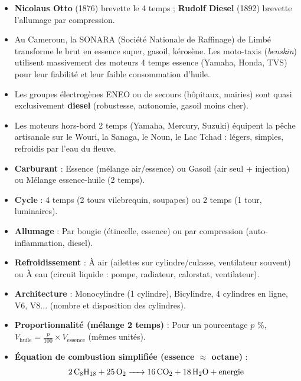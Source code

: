 \documentclass[11pt]{article}
\newcommand{\cle}[1]{{\popxbold\color{popdark}#1}}
\begin{document}
\begin{savaistu}
\begin{itemize}
\item \textbf{Nicolaus Otto} (1876) brevette le 4 temps ; \textbf{Rudolf Diesel} (1892) brevette l'allumage par compression.
\item Au Cameroun, la \cle{SONARA} (Société Nationale de Raffinage) de Limbé transforme le brut en essence super, gasoil, kérosène. Les moto-taxis (\emph{benskin}) utilisent massivement des moteurs 4 temps essence (Yamaha, Honda, TVS) pour leur fiabilité et leur faible consommation d'huile.
\item Les groupes électrogènes ENEO ou de secours (hôpitaux, mairies) sont quasi exclusivement \textbf{diesel} (robustesse, autonomie, gasoil moins cher).
\item Les moteurs hors-bord 2 temps (Yamaha, Mercury, Suzuki) équipent la pêche artisanale sur le Wouri, la Sanaga, le Noun, le Lac Tchad : légers, simples, refroidis par l'eau du fleuve.
\end{itemize}
\end{savaistu}

\begin{aretenir}
\begin{itemize}
\item \textbf{Carburant} : Essence (mélange air/essence) ou Gasoil (air seul + injection) ou Mélange essence-huile (2 temps).
\item \textbf{Cycle} : 4 temps (2 tours vilebrequin, soupapes) ou 2 temps (1 tour, luminaires).
\item \textbf{Allumage} : Par \cle{bougie} (étincelle, essence) ou par \cle{compression} (auto-inflammation, diesel).
\item \textbf{Refroidissement} : \cle{À air} (ailettes sur cylindre/culasse, ventilateur souvent) ou \cle{À eau} (circuit liquide : pompe, radiateur, calorstat, ventilateur).
\item \textbf{Architecture} : \cle{Monocylindre} (1 cylindre), \cle{Bicylindre}, \cle{4 cylindres en ligne}, \cle{V6}, \cle{V8}... (nombre et disposition des cylindres).
\item \textbf{Proportionnalité (mélange 2 temps)} : Pour un pourcentage $p$ \%, $V_{\text{huile}} = \frac{p}{100} \times V_{\text{essence}}$ (mêmes unités).
\item \textbf{Équation de combustion simplifiée (essence $\approx$ octane)} : 
\[ \ce{2 C8H18 + 25 O2 -> 16 CO2 + 18 H2O + energie} \]
\end{itemize}
\end{aretenir}
\end{document}
